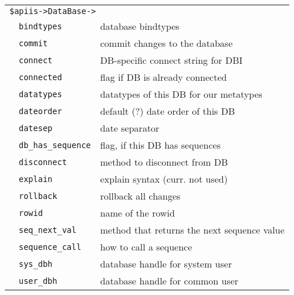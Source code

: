 \smallskip
\begin{tabular}{rl|l}
\multicolumn{3}{l}{\texttt{\$apiis->DataBase->}}       \\
                      &\verb+bindtypes+        & database bindtypes \\
                      &\verb+commit+           & commit changes to the database \\
                      &\verb+connect+          & DB-specific connect string for DBI \\
                      &\verb+connected+        & flag if DB is already connected \\
                      &\verb+datatypes+        & datatypes of this DB for our metatypes \\
                      &\verb+dateorder+        & default (?) date order of this DB \\
                      &\verb+datesep+          & date separator \\
                      &\verb+db_has_sequence+  & flag, if this DB has sequences \\
                      &\verb+disconnect+       & method to disconnect from DB \\
                      &\verb+explain+          & explain syntax (curr. not used) \\
                      &\verb+rollback+         & rollback all changes \\
                      &\verb+rowid+            & name of the rowid \\
                      &\verb+seq_next_val+     & method that returns the next sequence value \\
                      &\verb+sequence_call+    & how to call a sequence \\
                      &\verb+sys_dbh+          & database handle for system user \\
                      &\verb+user_dbh+         & database handle for common user \\
\end{tabular}
\medskip
